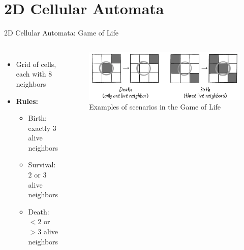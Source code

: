 \section{2D Cellular Automata}
\begin{frame}{2D Cellular Automata: Game of Life}
    \begin{columns}
        \begin{itemize}
            \item Grid of cells, each with $8$ neighbors
            \item \textbf{Rules:}
                  \begin{itemize}
                      \item Birth: exactly $3$ alive neighbors
                      \item Survival: $2$ or $3$ alive neighbors
                      \item Death: $<2$ or $>3$ alive neighbors
                  \end{itemize}
        \end{itemize}
        \begin{figure}
            \centering
            \includegraphics[width=\textwidth]{../paper/figures/game_of_life_examples}
            \caption{Examples of scenarios in the Game of Life\footnotemark}
        \end{figure}
    \end{columns}
\end{frame}

